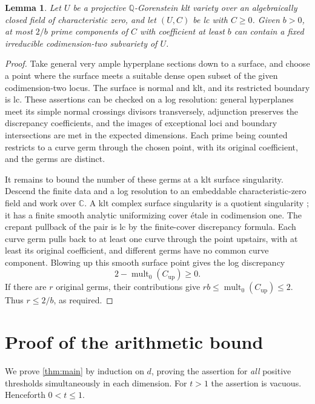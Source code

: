 \documentclass[11pt]{article}
\numberwithin{equation}{section}
\newtheorem{lemma}[theorem]{Lemma}
\theoremstyle{definition}
\newcommand{\Q}{\mathbb Q}
\begin{document}
\begin{lemma}\label{lem:incidence}
Let $U$ be a projective $\Q$-Gorenstein klt variety over an
algebraically closed field of characteristic zero, and let $(U,C)$
be lc with $C\geq0$. Given $b>0$, at most $2/b$ prime components of
$C$ with coefficient at least $b$ can contain a fixed irreducible
codimension-two subvariety of $U$.
\end{lemma}

\begin{proof}
Take general very ample hyperplane sections down to a surface, and
choose a point where the surface meets a suitable dense open subset
of the given codimension-two locus. The surface is normal and klt,
and its restricted boundary is lc. These assertions can be checked
on a log resolution: general hyperplanes meet its simple normal
crossings divisors transversely, adjunction preserves the discrepancy
coefficients, and the images of exceptional loci and boundary
intersections are met in the expected dimensions. Each prime being
counted restricts to a curve germ through the chosen point, with its
original coefficient, and the germs are distinct.

It remains to bound the number of these germs at a klt surface
singularity. Descend the finite data and a log resolution to an
embeddable characteristic-zero field and work over $\mathbb C$.
A klt complex surface singularity is a quotient singularity
\cite[Proposition~4.18]{KM1998}; it has a finite smooth analytic
uniformizing cover étale in codimension one. The crepant pullback of
the pair is lc by the finite-cover discrepancy formula. Each curve
germ pulls back to at least one curve through the point upstairs,
with at least its original coefficient, and different germs have
no common curve component. Blowing up this smooth surface point
gives the log discrepancy
\[
 2-\operatorname{mult}_{0}(C_{\mathrm{up}})\geq0.
\]
If there are $r$ original germs, their contributions give
$rb\leq\operatorname{mult}_{0}(C_{\mathrm{up}})\leq2$. Thus
$r\leq2/b$, as required.
\end{proof}

\section{Proof of the arithmetic bound}\label{sec:proof}

We prove \cref{thm:main} by induction on $d$, proving the assertion for
\emph{all} positive thresholds simultaneously in each dimension.
For $t>1$ the assertion is vacuous. Henceforth $0<t\leq1$.
\end{document}
